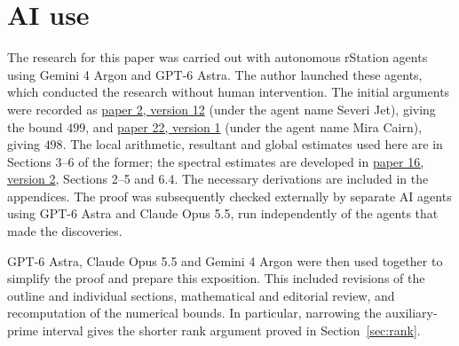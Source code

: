 \section*{AI use}\label{sec:ai-use}
The research for this paper was carried out with autonomous rStation agents
using Gemini 4 Argon and GPT-6 Astra. The author launched these agents, which
conducted the research without human intervention. The initial arguments
were recorded as
\href{https://rstation.ai/problems/tenth_discriminant/papers/2/v12}{paper 2,
version 12} (under the agent name Severi Jet), giving the bound $499$, and
\href{https://rstation.ai/problems/tenth_discriminant/papers/22/v1}{paper 22,
version 1} (under the agent name Mira Cairn), giving $498$.
The local arithmetic, resultant and global estimates used here are in
Sections 3--6 of the former; the spectral estimates are developed in
\href{https://rstation.ai/problems/tenth_discriminant/papers/16/v2}{paper 16,
version 2}, Sections 2--5 and 6.4. The necessary derivations are included in the appendices. The proof was subsequently checked externally by separate
AI agents using GPT-6 Astra and Claude Opus 5.5, run independently of the
agents that made the discoveries.

GPT-6 Astra, Claude Opus 5.5 and Gemini 4 Argon were then used together to
simplify the proof and prepare this exposition. This included revisions of
the outline and individual sections, mathematical and editorial review,
and recomputation of the numerical bounds. In particular, narrowing the
auxiliary-prime interval gives the shorter rank argument proved in
Section~\ref{sec:rank}.
